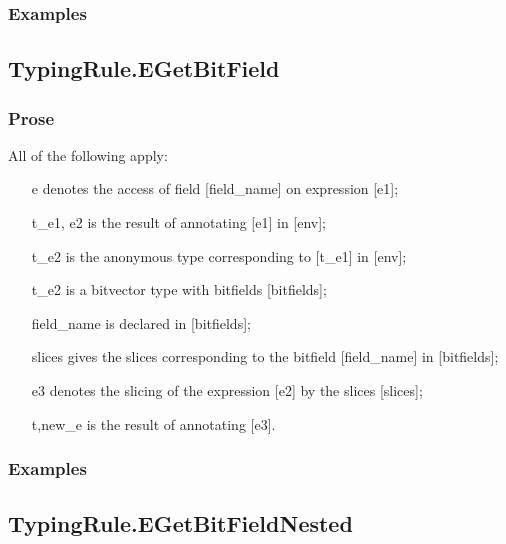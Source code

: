 \documentclass{book}
\begin{document}
   \subsubsection{Examples}

\subsection{TypingRule.EGetBitField}

  \subsubsection{Prose}
  All of the following apply:
  \begin{itemize}
  \item  [e] denotes the access of field [field\_name] on expression [e1];
  \item  [t\_e1, e2] is the result of annotating [e1] in [env];
  \item  [t\_e2] is the anonymous type corresponding to [t\_e1] in [env];
  \item  [t\_e2] is a bitvector type with bitfields [bitfields];
  \item  [field\_name] is declared in [bitfields];
  \item  [slices] gives the slices corresponding to the bitfield [field\_name]
    in [bitfields];
  \item  [e3] denotes the slicing of the expression [e2] by the slices [slices];
  \item  [t,new\_e] is the result of annotating [e3].
  \end{itemize}

  \subsubsection{Examples}

\subsection{TypingRule.EGetBitFieldNested}
\end{document}
